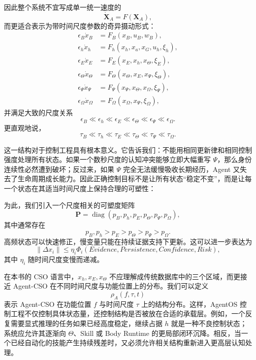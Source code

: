因此整个系统不宜写成单一统一速度的
\[
\dot{\mathbf X}_A=F(\mathbf X_A),
\]
而更适合表示为带时间尺度参数的奇异摄动形式：
\[
\begin{aligned}
\epsilon_B\dot{x}_B
&=
F_B(x_B,u_B,w_B),\\
\epsilon_h\dot{x}_h
&=
F_h(x_h,x_a,x_G,u_h,\xi_h),\\
\epsilon_E\dot{x}_E
&=
F_E(x_E,x_h,x_\Theta,\xi_E),\\
\epsilon_\Theta\dot{x}_\Theta
&=
F_\Theta(x_\Theta,x_E,x_\Psi,\xi_\Theta),\\
\epsilon_\Psi\dot{x}_\Psi
&=
F_\Psi(x_\Psi,x_\Theta,x_\Omega,\xi_\Psi),\\
\epsilon_\Omega\dot{x}_\Omega
&=
F_\Omega(x_\Omega,x_\Psi,\xi_\Omega),
\end{aligned}
\]
并满足大致的尺度关系
\[
\epsilon_B
\ll
\epsilon_h
\ll
\epsilon_E
\ll
\epsilon_\Theta
\ll
\epsilon_\Psi
\ll
\epsilon_\Omega.
\]
更直观地说，
\[
\tau_B
\ll
\tau_h
\ll
\tau_E
\ll
\tau_\Theta
\ll
\tau_\Psi
\ll
\tau_\Omega.
\]

这一结构对于控制工程具有根本意义。它告诉我们：不能用相同更新律和相同控制强度处理所有状态。如果一个数秒尺度的认知冲突能够立即大幅重写 $\Psi$，那么身份连续性必然遭到破坏；反过来，如果 $\Psi$ 完全无法缓慢吸收长期经历，Agent 又失去了生命周期成长能力。因此正确控制目标不是让所有状态“稳定不变”，而是让每一个状态在其适当时间尺度上保持合理的可塑性：
\begin{statementbox}
\centering
{}
\end{statementbox}

为此，我们引入一个尺度相关的可塑度矩阵
\[
\mathbf P
=
\operatorname{diag}
(
p_B,p_h,p_E,p_\Theta,p_\Psi,p_\Omega
),
\]
其中通常存在
\[
p_B,p_h
>
p_E
>
p_\Theta
>
p_\Psi
>
p_\Omega.
\]
高频状态可以快速修正，慢变量只能在持续证据支持下更新。这可以进一步表达为
\[
\|\Delta x_i\|
\le
\eta_i
\Phi_i(
Evidence,
Persistence,
Confidence,
Risk
),
\]
其中 $\eta_i$ 随时间尺度变慢而递减。

在本书的 CSO 语言中，$x_h,x_E,x_\Theta$ 不应理解成传统数据库中的三个区域，而更接近 Agent-CSO 在不同时间尺度与功能位置上的分布。我们可以定义
\[
\rho_A(f,\tau,t)
\]
表示 Agent-CSO 在功能位置 $f$ 与时间尺度 $\tau$ 上的结构分布。这样，AgentOS 控制工程不仅控制具体状态量，还控制结构是否被放在合适的承载层。例如，一个反复需要显式推理的任务如果已经高度稳定，继续占据 $h$ 就是一种不良控制状态；系统应允许其逐渐向 $\Theta$、Skill 或 Body Runtime 的更局部闭环沉降。相反，当一个已经自动化的技能产生持续残差时，又必须允许相关结构重新进入更高层认知处理。

